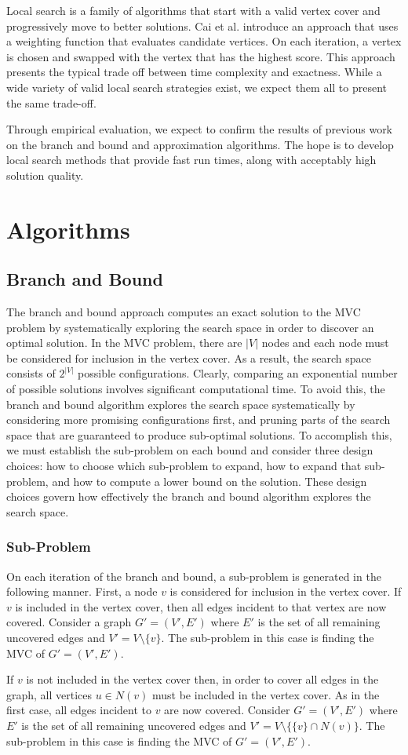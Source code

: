 \documentclass{sig-alternate-05-2015}
\begin{document}
\par
Local search is a family of algorithms that start with a valid vertex cover and progressively move to better solutions.  Cai et al. introduce an approach that uses a weighting function that evaluates candidate vertices. On each iteration, a vertex is chosen and swapped with the vertex that has the highest score. This approach presents the typical trade off between time complexity and exactness. While a wide variety of valid local search strategies exist, we expect them all to present the same trade-off.
\par 
Through empirical evaluation, we expect to confirm the results of previous work on the branch and bound and approximation algorithms. The hope is to develop local search methods that provide fast run times, along with acceptably high solution quality.

\section{Algorithms}
\subsection{Branch and Bound}
The branch and bound approach computes an exact solution to the MVC problem by systematically exploring the search space in order to discover an optimal solution. In the MVC problem, there are $|V|$ nodes and each node must be considered for inclusion in the vertex cover. As a result, the search space consists of $2^{|V|}$ possible configurations. Clearly, comparing an exponential number of possible solutions involves significant computational time. To avoid this, the branch and bound algorithm explores the search space systematically by considering more promising configurations first, and pruning parts of the search space that are guaranteed to produce sub-optimal solutions. To accomplish this, we must establish the sub-problem on each bound and consider three design choices: how to choose which sub-problem to expand, how to expand that sub-problem, and how to compute a lower bound on the solution. These design choices govern how effectively the branch and bound algorithm explores the search space.
\subsubsection{Sub-Problem}
On each iteration of the branch and bound, a sub-problem is generated in the following manner. First, a node $v$ is considered for inclusion in the vertex cover. If $v$ is included in the vertex cover, then all edges incident to that vertex are now covered. Consider a graph $G'=(V',E')$ where $E'$ is the set of all remaining uncovered edges and $V' = V \setminus \lbrace v \rbrace $. The sub-problem in this case is finding the MVC of $G' = (V',E')$.
\par
If $v$ is not included in the vertex cover then, in order to cover all edges in the graph, all vertices $u \in N(v)$ must be included in the vertex cover. As in the first case, all edges incident to $v$ are now covered. Consider $G'=(V',E')$  where $E'$ is the set of all remaining uncovered edges and $V' = V \setminus \lbrace \lbrace v \rbrace \cap N(v) \rbrace $. The sub-problem in this case is finding the MVC of $G' = (V',E')$. 
\end{document}
